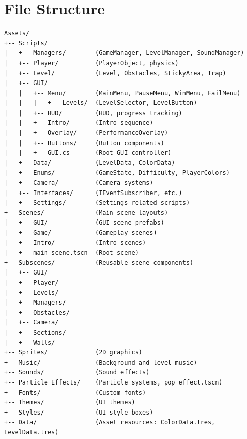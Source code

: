 \documentclass{report}
\begin{document}
\section{File Structure}
\begin{verbatim}
Assets/
+-- Scripts/
|   +-- Managers/        (GameManager, LevelManager, SoundManager)
|   +-- Player/          (PlayerObject, physics)
|   +-- Level/           (Level, Obstacles, StickyArea, Trap)
|   +-- GUI/
|   |   +-- Menu/        (MainMenu, PauseMenu, WinMenu, FailMenu)
|   |   |   +-- Levels/  (LevelSelector, LevelButton)
|   |   +-- HUD/         (HUD, progress tracking)
|   |   +-- Intro/       (Intro sequence)
|   |   +-- Overlay/     (PerformanceOverlay)
|   |   +-- Buttons/     (Button components)
|   |   +-- GUI.cs       (Root GUI controller)
|   +-- Data/            (LevelData, ColorData)
|   +-- Enums/           (GameState, Difficulty, PlayerColors)
|   +-- Camera/          (Camera systems)
|   +-- Interfaces/      (IEventSubscriber, etc.)
|   +-- Settings/        (Settings-related scripts)
+-- Scenes/              (Main scene layouts)
|   +-- GUI/             (GUI scene prefabs)
|   +-- Game/            (Gameplay scenes)
|   +-- Intro/           (Intro scenes)
|   +-- main_scene.tscn  (Root scene)
+-- Subscenes/           (Reusable scene components)
|   +-- GUI/
|   +-- Player/
|   +-- Levels/
|   +-- Managers/
|   +-- Obstacles/
|   +-- Camera/
|   +-- Sections/
|   +-- Walls/
+-- Sprites/             (2D graphics)
+-- Music/               (Background and level music)
+-- Sounds/              (Sound effects)
+-- Particle_Effects/    (Particle systems, pop_effect.tscn)
+-- Fonts/               (Custom fonts)
+-- Themes/              (UI themes)
+-- Styles/              (UI style boxes)
+-- Data/                (Asset resources: ColorData.tres, LevelData.tres)
\end{verbatim}
\end{document}
